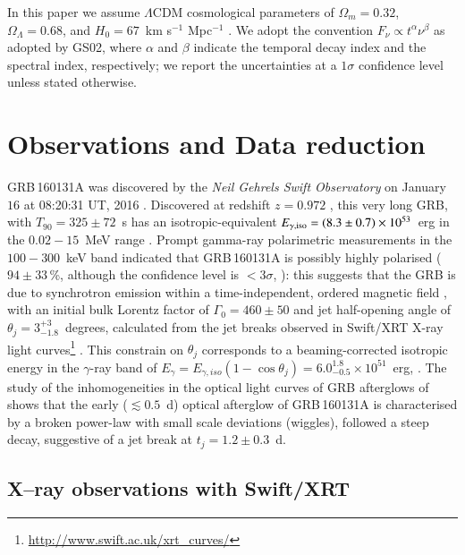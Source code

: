 \documentclass{aa}
\begin{document}
In this paper we assume $\Lambda$CDM cosmological parameters of $\Omega_m = 0.32$, $\Omega_{\Lambda} = 0.68$, and $H_0 = 67$~km s$^{-1}$ Mpc$^{-1}$ \citep{cosmoPlanck18}.
We adopt the convention $F_{\nu} \propto t^{\alpha} \nu^{\beta}$ as adopted by GS02, where $\alpha$ and $\beta$ indicate the temporal decay index and the spectral index, respectively; we report the uncertainties at a $1\sigma$ confidence level unless stated otherwise.


\section{Observations and Data reduction}
\label{sec:obs}

GRB\,160131A was discovered by the {\it Neil Gehrels Swift Observatory} \citep{Gehrels04} on January $16$ at 08:20:31 UT, 2016 \citep{Page16}.
Discovered at redshift  $z = 0.972$ \citep{Malesani16,DeUgarte16b}, this very long GRB, with $T_{90} = 325\pm 72$~s \citep{Cummings16} has an isotropic-equivalent $E_{\gamma,{\rm iso}} = (8.3\pm0.7)\times 10^{53}$~erg in the $0.02-15$~MeV range \citep{Tsvetkova16}.
Prompt gamma-ray polarimetric measurements in the $100-300$~keV band indicated that GRB\,160131A is possibly highly polarised ($94 \pm 33$\,\%, although the confidence level is $< 3\sigma$, \citealt{Chattopadhyay19}): this suggests that the GRB is due to synchrotron emission within a time-independent, ordered magnetic field \citep{Nakar03,Granot03,Waxman03}, with an initial bulk Lorentz factor of $\Gamma_0 = 460 \pm 50$ and jet half-opening angle of $\theta_j = 3^{+3}_{-1.8}$~degrees, calculated from the jet breaks observed in Swift/XRT X-ray light curves\footnote{\url{http://www.swift.ac.uk/xrt_curves/}} \citep{Sari99c,Frail01}.
This constrain on $\theta_j$ corresponds to a beaming-corrected isotropic energy in the $\gamma$-ray band of $E_{\gamma} = E_{\gamma,iso} (1 - \cos{\theta_j}) = 6.0^{1.8}_{-0.5} \times 10^{51}$~erg, \citep{Chattopadhyay19}.
The study of the inhomogeneities in the optical light curves of GRB afterglows of \citet{Mazaeva18} shows that the early ($\lesssim 0.5$~d) optical afterglow of GRB\,160131A is characterised by a broken power-law with small scale deviations (wiggles), followed a steep decay, suggestive of a jet break at $t_j = 1.2 \pm 0.3$~d.


\subsection{X--ray observations with Swift/XRT}
\label{subsec:XRT}
\end{document}
